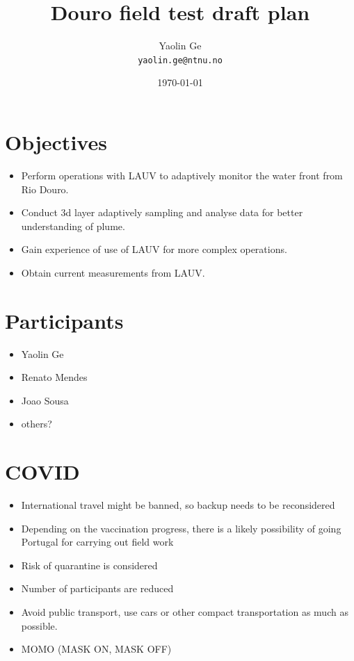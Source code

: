 \documentclass{article}
\title{Douro field test draft plan} %
\author{Yaolin Ge\\ \texttt{yaolin.ge@ntnu.no}} %
\date{\today} %
\begin{document}
\maketitle %


\section*{Objectives} %

\begin{itemize}
\item Perform operations with LAUV to adaptively monitor the water front from Rio Douro. 
\item Conduct 3d layer adaptively sampling and analyse data for better understanding of plume. 
\item Gain experience of use of LAUV for more complex operations.
\item Obtain current measurements from LAUV.
\end{itemize}

\section*{Participants}
\begin{itemize}
\item Yaolin Ge
\item Renato Mendes
\item Joao Sousa
\item others?
\end{itemize}


\section*{COVID}
\begin{itemize}
\item	International travel might be banned, so backup needs to be reconsidered 
\item	Depending on the vaccination progress, there is a likely possibility of going Portugal for carrying out field work
\item	Risk of quarantine is considered
\item	Number of participants are reduced
\item	Avoid public transport, use cars or other compact transportation as much as possible.
\item	MOMO (MASK ON, MASK OFF) 

\end{itemize}
\end{document}
